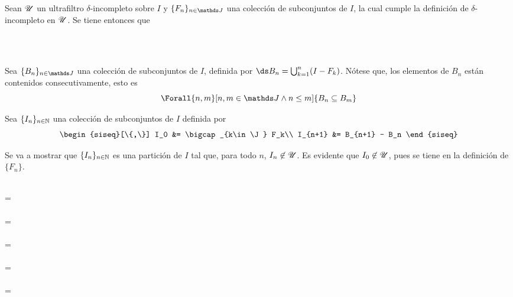 \begin{demo}
  Sean $\mathscr{U}$ un ultrafiltro $\delta$-incompleto sobre $I$ y
  $\{F_n\}_{n\in\J}$ una colección de subconjuntos de $I$, la cual
  cumple la definición de $\delta$-incompleto en $\mathscr{U}$. Se tiene
  entonces que
  \begin{longderivation}
      \\
    \\
  \end{longderivation}

  Sea $\{B_n\}_{n\in\J}$ una colección de subconjuntos de $I$, definida por
  $\ds B_n = \bigcup_{k=1}^n (I - F_k)$. Nótese que, los elementos de
  $B_n$ están contenidos consecutivamente, esto es
  \[\Forall{n,m}[n,m\in\J \land n \leq m]{B_n \subseteq B_m}\]

  Sea $\{I_n\}_{n\in\mathbb{N}}$ una colección de subconjuntos de $I$ definida por
  \[
    \begin{siseq}[\{,\}]
      I_0     &= \bigcap_{k\in\J} F_k\\
      I_{n+1} &= B_{n+1} - B_n
    \end{siseq}
  \]

  Se va a mostrar que $\{I_n\}_{n\in\mathbb{N}}$ es una partición de $I$ tal que,
  para todo $n$, $I_n\not\in\mathscr{U}$. Es evidente que $I_0\not\in\mathscr{U}$, pues se
  tiene en la definición de $\{F_n\}$.
  \begin{longderivation}
      \\
    =\\
      \\
    =\\
      \\
    =\\
      \\
    =\\
      \\
    =\\
  \end{longderivation}


\end{demo}
